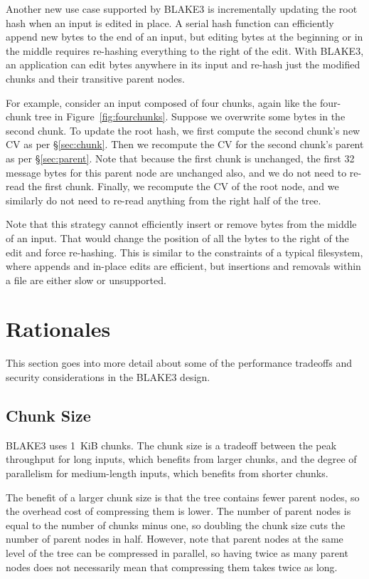 \documentclass[11pt,notitlepage,a4paper]{article}
\begin{document}
Another new use case supported by BLAKE3 is incrementally updating the root
hash when an input is edited in place. A serial hash function can efficiently
append new bytes to the end of an input, but editing bytes at the beginning or
in the middle requires re-hashing everything to the right of the edit. With
BLAKE3, an application can edit bytes anywhere in its input and re-hash just
the modified chunks and their transitive parent nodes.

For example, consider an input composed of four chunks, again like the
four-chunk tree in Figure~\ref{fig:fourchunks}. Suppose we overwrite some bytes
in the second chunk. To update the root hash, we first compute the second
chunk's new CV as per \S\ref{sec:chunk}. Then we recompute the CV for the
second chunk's parent as per \S\ref{sec:parent}. Note that because the first
chunk is unchanged, the first 32 message bytes for this parent node are
unchanged also, and we do not need to re-read the first chunk. Finally, we
recompute the CV of the root node, and we similarly do not need to re-read
anything from the right half of the tree.

Note that this strategy cannot efficiently insert or remove bytes from the
middle of an input. That would change the position of all the bytes to the
right of the edit and force re-hashing. This is similar to the constraints of a
typical filesystem, where appends and in-place edits are efficient, but
insertions and removals within a file are either slow or unsupported.

\section{Rationales}\label{sec:rationales}

This section goes into more detail about some of the performance tradeoffs and
security considerations in the BLAKE3 design.

\subsection{Chunk Size}\label{sec:chunksize}

BLAKE3 uses 1~KiB chunks. The chunk size is a tradeoff between the peak
throughput for long inputs, which benefits from larger chunks, and the degree
of parallelism for medium-length inputs, which benefits from shorter chunks.

The benefit of a larger chunk size is that the tree contains fewer parent
nodes, so the overhead cost of compressing them is lower. The number of parent
nodes is equal to the number of chunks minus one, so doubling the chunk size
cuts the number of parent nodes in half. However, note that parent nodes at the
same level of the tree can be compressed in parallel, so having twice as many
parent nodes does not necessarily mean that compressing them takes twice as
long.
\end{document}
